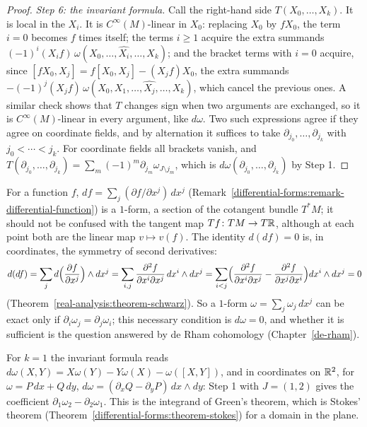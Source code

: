 \begin{proof}
\emph{Step 6: the invariant formula.} Call the right-hand side $T(X_0, \ldots, X_k)$. It is local in the $X_i$. It is $C^\infty(M)$-linear in $X_0$: replacing $X_0$ by $fX_0$, the
term $i = 0$ becomes $f$ times itself; the terms $i \geq 1$ acquire the extra summands $(-1)^i(X_if)\,\omega(X_0, \ldots, \widehat{X_i}, \ldots, X_k)$; and the bracket terms with
$i = 0$ acquire, since $[fX_0, X_j] = f[X_0, X_j] - (X_jf)X_0$, the extra summands $-(-1)^j(X_jf)\,\omega(X_0, X_1, \ldots, \widehat{X_j}, \ldots, X_k)$, which cancel the previous ones.
A similar check shows that $T$ changes sign when two arguments are exchanged, so it is $C^\infty(M)$-linear in every argument, like $d\omega$. Two such expressions agree if they
agree on coordinate fields, and by alternation it suffices to take $\partial_{j_0}, \ldots, \partial_{j_k}$ with $j_0 < \cdots < j_k$. For coordinate fields all brackets vanish,
and $T(\partial_{j_0}, \ldots, \partial_{j_k}) = \sum_m(-1)^m\partial_{j_m}\omega_{J \setminus j_m}$, which is $d\omega(\partial_{j_0}, \ldots, \partial_{j_k})$ by Step 1.
\end{proof}

\begin{remark}\label{differential-forms:remark-ddf}
For a function $f$, $df = \sum_j(\partial f/\partial x^j)\,dx^j$ (Remark~\ref{differential-forms:remark-differential-function}) is a $1$-form, a section of the cotangent bundle $T^*M$; it should
not be confused with the tangent map $Tf \colon TM \to T\mathbb{R}$, although at each point both are the linear map $v \mapsto v(f)$. The identity $d(df) = 0$ is, in coordinates, the symmetry of second
derivatives:
\[
d(df) = \sum_j d\Bigl(\frac{\partial f}{\partial x^j}\Bigr) \wedge dx^j = \sum_{i,j}\frac{\partial^2f}{\partial x^i\partial x^j}\,dx^i \wedge dx^j
= \sum_{i<j}\Bigl(\frac{\partial^2f}{\partial x^i\partial x^j} - \frac{\partial^2f}{\partial x^j\partial x^i}\Bigr)dx^i \wedge dx^j = 0
\]
(Theorem~\ref{real-analysis:theorem-schwarz}). So a $1$-form $\omega = \sum_j\omega_j\,dx^j$ can be exact only if $\partial_i\omega_j = \partial_j\omega_i$; this necessary condition is $d\omega = 0$, and
whether it is sufficient is the question answered by de Rham cohomology (Chapter~\ref{de-rham}).
\end{remark}

\begin{example}\label{differential-forms:example-exterior-derivative-low}
For $k = 1$ the invariant formula reads $d\omega(X, Y) = X\omega(Y) - Y\omega(X) - \omega([X, Y])$, and in coordinates on $\mathbb{R}^2$, for $\omega = P\,dx + Q\,dy$,
$d\omega = (\partial_xQ - \partial_yP)\,dx \wedge dy$: Step 1 with $J = (1, 2)$ gives the coefficient $\partial_1\omega_2 - \partial_2\omega_1$. This is the integrand of Green's theorem,
which is Stokes' theorem (Theorem~\ref{differential-forms:theorem-stokes}) for a domain in the plane.
\end{example}


